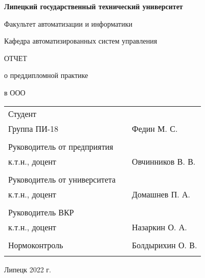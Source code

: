 \begin{center}
    \textbf{Липецкий государственный технический университет}

    Факультет автоматизации и информатики

    Кафедра автоматизированных систем управления
\end{center}

\vfill

\begin{center}
    ОТЧЕТ

    о преддипломной практике

    в ООО 
\end{center}
\vfill

\noindent\begin{tabularx}{\textwidth}{lCl}
    Студент & & \\
    Группа ПИ-18 & & Федин М. С. \\
     \\
    Руководитель от предприятия & & \\
    к.т.н., доцент & & Овчинников В. В. \\
     \\
    Руководитель от университета & & \\
    к.т.н., доцент & & Домашнев П. А. \\
     \\
    Руководитель ВКР & & \\
    к.т.н., доцент & & Назаркин О. А. \\
     \\
    Нормоконтроль & & Болдырихин О. В. \\
     \\
\end{tabularx}

\vfill

\begin{center}
    Липецк 2022 г.
\end{center}
\thispagestyle{empty}
\clearpage
